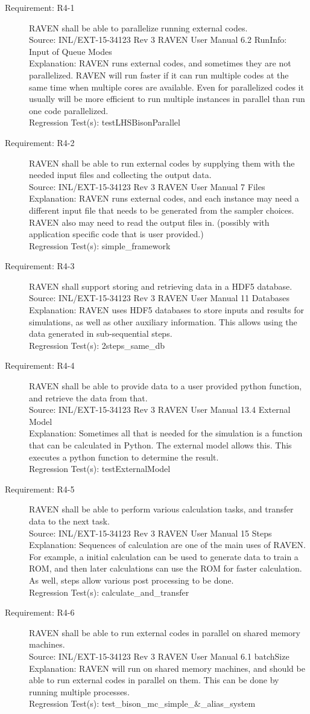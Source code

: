 \documentclass{article}
\newcommand{\requirement}[5]{\item[Requirement: #1] #2 \\Source: #3\\Explanation: #4\\Regression Test(s): #5}
\begin{document}
\begin{description}
\requirement{R4-1}{RAVEN shall be able to parallelize running external codes.}
{INL/EXT-15-34123 Rev 3 RAVEN User Manual 6.2 RunInfo: Input of Queue Modes}
{RAVEN runs external codes, and sometimes they are not parallelized.  RAVEN will run faster if it can run multiple codes at the same time when multiple cores are available.  Even for parallelized codes it usually will be more efficient to run multiple instances in parallel than run one code parallelized.}
{testLHSBisonParallel}

\requirement{R4-2}{RAVEN shall be able to run external codes by supplying them with the needed input files and collecting the output data.}
{INL/EXT-15-34123 Rev 3 RAVEN User Manual 7 Files}
{RAVEN runs external codes, and each instance may need a different input file that needs to be generated from the sampler choices.  RAVEN also may need to read the output files in. (possibly with application specific code that is user provided.)}
{simple\_framework}

\requirement{R4-3}{RAVEN shall support storing and retrieving data in a HDF5 database.}
{INL/EXT-15-34123 Rev 3 RAVEN User Manual 11 Databases}
{RAVEN uses HDF5 databases to store inputs and results for simulations, as well as other auxiliary information.  This allows using the data generated in sub-sequential steps.}
{2steps\_same\_db}

\requirement{R4-4}{RAVEN shall be able to provide data to a user provided python function, and retrieve the data from that.}
{INL/EXT-15-34123 Rev 3 RAVEN User Manual 13.4 External Model}
{Sometimes all that is needed for the simulation is a function that can be calculated in Python.  The external model allows this.  This executes a python function to determine the result.}
{testExternalModel}

\requirement{R4-5}{RAVEN shall be able to perform various calculation tasks, and transfer data to the next task.}
{INL/EXT-15-34123 Rev 3 RAVEN User Manual 15 Steps}
{Sequences of calculation are one of the main uses of RAVEN.  For example, a initial calculation can be used to generate data to train a ROM, and then later calculations can use the ROM for faster calculation.  As well, steps allow various post processing to be done.}
{calculate\_and\_transfer}

\requirement{R4-6}{RAVEN shall be able to run external codes in parallel on shared memory machines.}
{INL/EXT-15-34123 Rev 3 RAVEN User Manual 6.1 batchSize}
{RAVEN will run on shared memory machines, and should be able to run external codes in parallel on them.  This can be done by running multiple processes.}
{test\_bison\_mc\_simple\_\&\_alias\_system}


\end{description}
\end{document}
